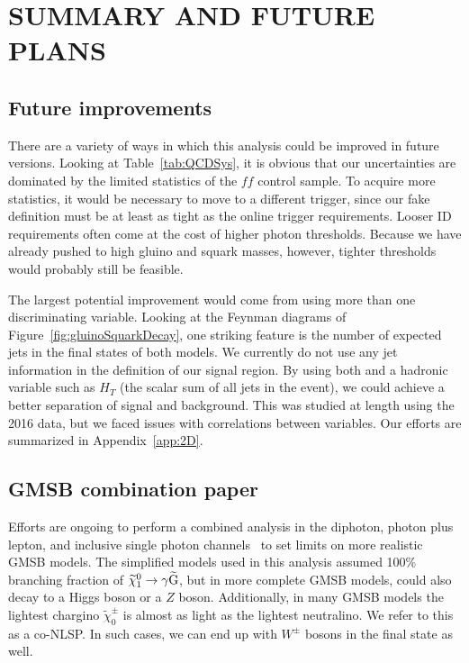 \chapter{SUMMARY AND FUTURE PLANS}
\label{chap:Conclusions}

\section{Future improvements}
\label{sec:future}

There are a variety of ways in which this analysis could be improved in
future versions. Looking at Table~\ref{tab:QCDSys}, it is obvious that 
our uncertainties are dominated by the limited statistics of the $ff$ control 
sample. To acquire more statistics, it would be necessary to move to a
different trigger, since our fake definition must be at least as tight as 
the online trigger requirements. Looser ID requirements often
come at the cost of higher photon \pT thresholds. Because we 
have already pushed to high gluino and squark masses, however,
tighter \pT thresholds would probably still be feasible.

The largest potential improvement would come from using more than 
one discriminating variable. Looking at the Feynman diagrams of 
Figure~\ref{fig:gluinoSquarkDecay}, one striking feature is the 
number of expected jets in the final states of both models. We 
currently do not use any jet information in the definition of our 
signal region. By using both \ETmiss and a hadronic variable 
such as $H_T$ (the scalar \pT sum of all jets in the event), 
we could achieve a better separation of signal and background.
This was studied at length using the 2016 data, but we faced issues
with correlations between variables. Our efforts are summarized
in Appendix~\ref{app:2D}.

\section{GMSB combination paper}
\label{sec:combo}
Efforts are ongoing to perform a combined analysis in the diphoton,
photon plus lepton, and inclusive single photon channels~\cite{PhotonHT, PhotonMET} to set limits on 
more realistic GMSB models. The simplified models used in this 
analysis assumed 100\% branching fraction of $\widetilde{\chi}^{0}_{1} \rightarrow \gamma\widetilde{\mathrm{G}}$,
but in more complete GMSB models, \neutralino could also decay to a Higgs boson 
or a $Z$ boson. Additionally, in many GMSB models the lightest chargino $\widetilde{\chi}^\pm_0$
is almost as light as the lightest neutralino. We refer to this as a co-NLSP. In such cases, 
we can end up with $W^\pm$ bosons in the final state as well. 

